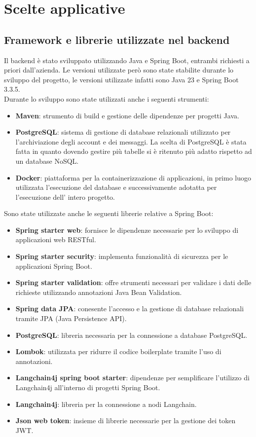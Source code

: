 \section{Scelte applicative}
\subsection{Framework e librerie utilizzate nel backend} 
    Il backend è stato sviluppato utilizzando Java e Spring Boot, entrambi 
    richiesti a priori dall'azienda. Le versioni utilizzate però sono state 
    stabilite durante lo sviluppo del progetto, le versioni utilizzate infatti 
    sono Java 23 e Spring Boot 3.3.5.\\
    Durante lo sviluppo sono state utilizzati anche i seguenti strumenti:
    \begin{itemize}
        \item \textbf{Maven}: strumento di build e gestione delle dipendenze per progetti Java.
        \item \textbf{PostgreSQL}: sistema di gestione di database relazionali utilizzato per l'archiviazione 
        degli account e dei messaggi. La scelta di PostgreSQL è stata fatta in quanto dovendo gestire più tabelle 
        si è ritenuto più adatto rispetto ad un database NoSQL.
        \item \textbf{Docker}: piattaforma per la containerizzazione di applicazioni, in primo luogo utilizzata 
        l'esecuzione del database e successivamente adotatta per l'esecuzione dell' intero progetto.
    \end{itemize}
    Sono state utilizzate anche le seguenti librerie relative a Spring Boot:
    \begin{itemize}
        \item \textbf{Spring starter web}: fornisce le dipendenze necessarie per lo sviluppo di applicazioni web RESTful.
        \item \textbf{Spring starter security}: implementa funzionalità di sicurezza per le applicazioni Spring Boot.
        \item \textbf{Spring starter validation}: offre strumenti necessari per validare i dati delle richieste utilizzando annotazioni Java Bean Validation. 
        \item \textbf{Spring data JPA}: conesente l'accesso e la gestione di database relazionali tramite JPA (Java Persistence API).
        \item \textbf{PostgreSQL}: libreria necessaria per la connessione a database PostgreSQL.
        \item \textbf{Lombok}: utilizzata per ridurre il codice boilerplate tramite l'uso di annotazioni.
        \item \textbf{Langchain4j spring boot starter}: dipendenze per semplificare l'utilizzo di Langchain4j all'interno di progetti Spring Boot.
        \item \textbf{Langchain4j}: libreria per la connessione a nodi Langchain.
        \item \textbf{Json web token}: insieme di librerie necessarie per la gestione dei token JWT.
    \end{itemize}
